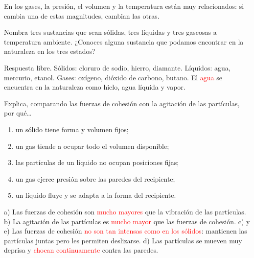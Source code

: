 En los gases, la presión, el volumen y la temperatura están muy relacionados: si cambia una de estas magnitudes, cambian las otras.

\begin{exercise}
    Nombra tres sustancias que sean sólidas, tres líquidas y tres gaseosas a temperatura ambiente. ¿Conoces alguna sustancia que podamos encontrar en la naturaleza en los tres estados?
    \begin{solu}
        Respuesta libre. Sólidos: cloruro de sodio, hierro, diamante. Líquidos: agua, mercurio, etanol. Gases: oxígeno, dióxido de carbono, butano. El \textcolor{red}{agua} se encuentra en la naturaleza como hielo, agua líquida y vapor.
    \end{solu}
\end{exercise}

\begin{exercise}
    Explica, comparando las fuerzas de cohesión con la agitación de las partículas, por qué\ldots
    \begin{enumerate}[label=\alph*)]
        \item un sólido tiene forma y volumen fijos;
        \item un gas tiende a ocupar todo el volumen disponible;
        \item las partículas de un líquido no ocupan posiciones fijas;
        \item un gas ejerce presión sobre las paredes del recipiente;
        \item un líquido fluye y se adapta a la forma del recipiente.
    \end{enumerate}
    \begin{solu}
        a) Las fuerzas de cohesión son \textcolor{red}{mucho mayores} que la vibración de las partículas. b) La agitación de las partículas es \textcolor{red}{mucho mayor} que las fuerzas de cohesión. c) y e) Las fuerzas de cohesión \textcolor{red}{no son tan intensas como en los sólidos}: mantienen las partículas juntas pero les permiten deslizarse. d) Las partículas se mueven muy deprisa y \textcolor{red}{chocan continuamente} contra las paredes.
    \end{solu}
\end{exercise}

